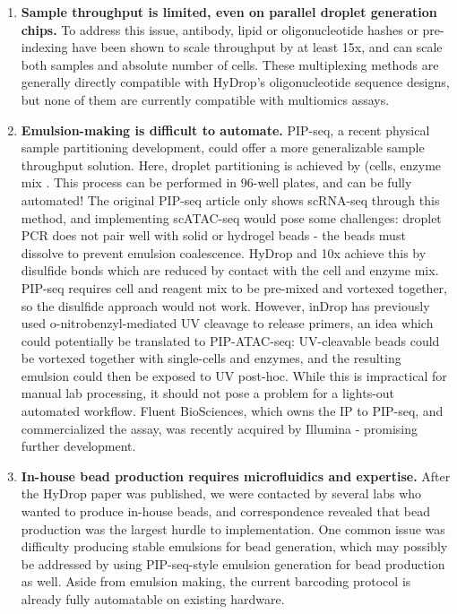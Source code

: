 \begin{enumerate}[noitemsep]
    \item \textbf{Sample throughput is limited, even on parallel droplet generation chips.} To address this issue, antibody, lipid or oligonucleotide hashes or pre-indexing have been shown to scale throughput by at least 15x, and can scale both samples and absolute number of cells. These multiplexing methods are generally directly compatible with HyDrop's oligonucleotide sequence designs, but none of them are currently compatible with multiomics assays.
    \item \textbf{Emulsion-making is difficult to automate.} PIP-seq, a recent physical sample partitioning development, could offer a more generalizable sample throughput solution. Here, droplet partitioning is achieved by (cells, enzyme mix . This process can be performed in 96-well plates, and can be fully automated! The original PIP-seq article only shows scRNA-seq through this method, and implementing scATAC-seq would pose some challenges: droplet PCR does not pair well with solid or hydrogel beads - the beads must dissolve to prevent emulsion coalescence. HyDrop and 10x achieve this by disulfide bonds which are reduced by contact with the cell and enzyme mix. PIP-seq requires cell and reagent mix to be pre-mixed and vortexed together, so the disulfide approach would not work. However, inDrop has previously used o-nitrobenzyl-mediated UV cleavage to release primers, an idea which could potentially be translated to PIP-ATAC-seq: UV-cleavable beads could be vortexed together with single-cells and enzymes, and the resulting emulsion could then be exposed to UV post-hoc. While this is impractical for manual lab processing, it should not pose a problem for a lights-out automated workflow. Fluent BioSciences, which owns the IP to PIP-seq, and commercialized the assay, was recently acquired by Illumina - promising further development.
    \item \textbf{In-house bead production requires microfluidics and expertise.} After the HyDrop paper was published, we were contacted by several labs who wanted to produce in-house beads, and correspondence revealed that bead production was the largest hurdle to implementation. One common issue was difficulty producing stable emulsions for bead generation, which may possibly be addressed by using PIP-seq-style emulsion generation for bead production as well. Aside from emulsion making, the current barcoding protocol is already fully automatable on existing hardware.
\end{enumerate}


